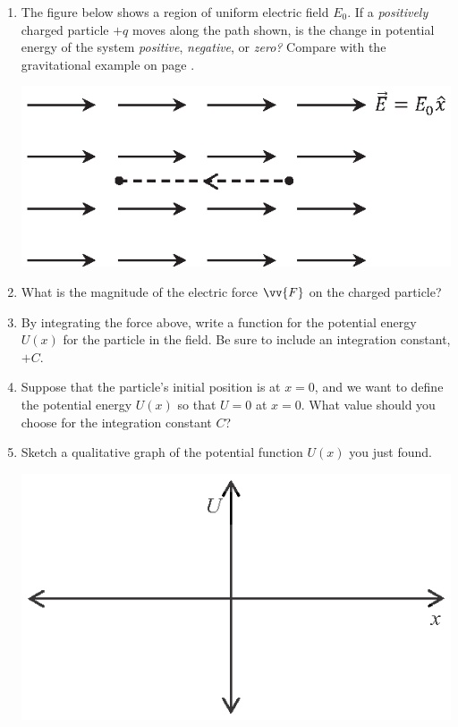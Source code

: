 \begin{enumerate}[wide, label=(\emph{\alph*})]

\item The figure below shows a region of uniform electric field $E_0$.  If a \textit{positively} charged particle $+q$ moves along the path shown, is the change in potential energy of the system \textit{positive}, \textit{negative}, or \textit{zero?}  Compare with the gravitational example on page \pageref{part_potential_intro_grav_work}.
\begin{center}
\includegraphics{potential_intro/activity_2_figs/uniform_E_field.eps}
\end{center}


\item What is the magnitude of the electric force $\vv{F}$ on the charged particle?
\answerspace{0.3in}

\item By integrating the force above, write a function for the potential energy $U(x)$ for the particle in the field.  Be sure to include an integration constant, $+C$.
\answerspace{0.3in}

\item Suppose that the particle's initial position is at $x=0$, and we want to define the potential energy $U(x)$ so that $U=0$ at $x=0$.  What value should you choose for the integration constant $C$?
\answerspace{0.3in}

\item Sketch a qualitative graph of the potential function $U(x)$ you just found.
\begin{center}
\vspace{-0.1in}
\includegraphics{potential_intro/activity_2_figs/U_axes_2.eps}
\vspace{-0.1in}
\end{center}


\end{enumerate}
